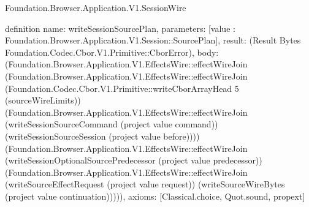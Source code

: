\begin{lexlean}{Foundation.Browser.Application.V1.SessionWire}
\begin{semanticmodule}
definition{
  name: writeSessionSourcePlan,
  parameters: [value : Foundation.Browser.Application.V1.Session::SourcePlan],
  result: (Result Bytes Foundation.Codec.Cbor.V1.Primitive::CborError),
  body: (Foundation.Browser.Application.V1.EffectsWire::effectWireJoin (Foundation.Browser.Application.V1.EffectsWire::effectWireJoin (Foundation.Codec.Cbor.V1.Primitive::writeCborArrayHead 5 (sourceWireLimits)) (Foundation.Browser.Application.V1.EffectsWire::effectWireJoin (writeSessionSourceCommand (project value command)) (writeSessionSourceSession (project value before)))) (Foundation.Browser.Application.V1.EffectsWire::effectWireJoin (writeSessionOptionalSourcePredecessor (project value predecessor)) (Foundation.Browser.Application.V1.EffectsWire::effectWireJoin (writeSourceEffectRequest (project value request)) (writeSourceWireBytes (project value continuation))))),
  axioms: [Classical.choice, Quot.sound, propext]
}


\end{semanticmodule}
\end{lexlean}
